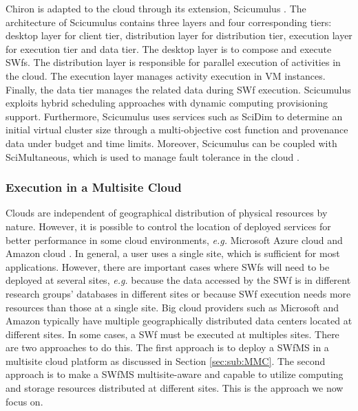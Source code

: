 Chiron is adapted to the cloud through its extension, Scicumulus \cite{Oliveira2010,Oliveira2012}. 
The architecture of Scicumulus contains three layers and four corresponding tiers: desktop layer 
for client tier, distribution layer for distribution tier, execution layer for 
execution tier and data tier. The desktop layer is to compose and execute SWfs. 
The distribution layer is responsible for parallel execution of activities in the cloud. 
The execution layer manages activity execution in VM instances. Finally, the data tier 
manages the related data during SWf execution. Scicumulus exploits hybrid scheduling approaches 
with dynamic computing provisioning support. Furthermore, Scicumulus uses 
services such as SciDim \cite{Oliveira2013} to determine an initial virtual cluster size 
through a multi-objective cost function and provenance data under budget and time limits. 
Moreover, Scicumulus can be coupled with  SciMultaneous, which is used
to manage fault tolerance in the cloud \cite{Costa2012}. 

\subsubsection{Execution in a Multisite Cloud}

Clouds are independent of geographical distribution of physical resources by nature. However, it is possible to control the location of deployed services for better performance in some cloud environments, \textit{e.g.} Microsoft Azure cloud \cite{MicrosoftAzure} and Amazon cloud \cite{AmazonCloud}.
In general, a user uses a single site, which is sufficient for most applications.
However, there are important cases where SWfs will
need to be deployed at several sites, \textit{e.g.} because the data accessed by
the SWf is in different research groups' databases in different
sites or because SWf execution needs more resources than those at a
single site. Big cloud providers such as Microsoft and Amazon
typically have multiple geographically distributed data centers located at different sites. 
In some cases, a SWf must be executed at multiples sites.
There are two approaches to do this. The first approach is to deploy
a SWfMS in a multisite cloud platform as discussed in
Section \ref{sec:sub:MMC}. The second approach is to make a SWfMS multisite-aware
and capable to utilize computing and storage resources
distributed at different sites. This is the approach we now focus on.

